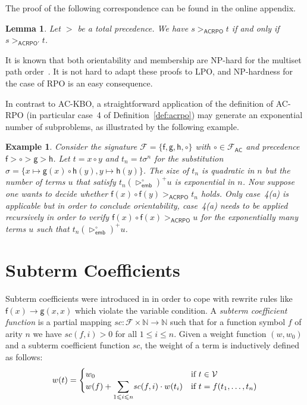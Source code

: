 \documentclass{tlp}
\newtheorem{lemma}[theorem]{Lemma}
\newtheorem{example}[theorem]{Example}
\newcommand{\embsm}[1]{\vartriangleright^{\!#1}_{\!\mathsf{emb}}}
\newcommand{\m}[1]{\mathsf{#1}}
\newcommand{\mc}[1]{\mathcal{#1}}
\newcommand{\mr}[1]{\mathrm{#1}}
\newcommand{\FF}{\mc{F}}
\newcommand{\VV}{\mc{V}}
\newcommand{\AC}{\mr{\m{AC}}}
\newcommand{\scoeff}{\mathit{sc}}
\newcommand{\acrpo}{\mr{\m{ACRPO}}}
\newcommand{\acrpoo}{\mr{\m{ACRPO'}}}
\newcommand{\seq}[2][n]{{#2_1},\dots,{#2_{#1}}}
\newcommand{\Nat}{\mathbb{N}}
\begin{document}
The proof of the following correspondence can be found in the online appendix.
\begin{lemma}
\label{lem:acrpo}
Let $>$ be a total precedence.
We have $s >_\acrpo t$ if and only if $s >_\acrpoo t$. 
\end{lemma}

It is known that both orientability and membership are NP-hard for the
multiset path order~\cite{KN85}. It is not hard to adapt these proofs to
LPO, and NP-hardness for the case of RPO is an easy consequence.

In contrast to AC-KBO, a straightforward application of the definition 
of AC-RPO (in particular case~4 of Definition~\ref{def:acrpo}) may 
generate an exponential number of subproblems, as illustrated by the 
following example.

\begin{example}
Consider the signature
$\FF = \{ \m{f}, \m{g}, \m{h}, \circ \}$ with $\circ \in \FF_\AC$ and
precedence $\m{f} > {\circ} > \m{g} > \m{h}$.
Let $t = x \circ y$ and $t_n = t\sigma^n$ for the substitution
$\sigma = \{ x \mapsto \m{g}(x) \circ \m{h}(y), y \mapsto \m{h}(y) \}$.
The size of $t_n$ is quadratic in $n$ but the number of terms $u$
that satisfy $t_n \mathrel{(\embsm{\circ})^+} u$ is exponential 
in $n$. Now suppose one wants to decide whether 
$\m{f}(x) \circ \m{f}(y) >_\acrpo t_n$ holds.
Only case~4(a) is applicable but in order to conclude orientability,
case~4(a) needs to be applied recursively in order to verify 
$\m{f}(x) \circ \m{f}(x) >_\acrpo  u$ for the exponentially many 
terms $u$ such that $t_n \mathrel{(\embsm{\circ})^+} u$.
\end{example}

\section{Subterm Coefficients}
\label{subterm coefficients}

Subterm coefficients were introduced in \cite{LW07} in order to
cope with rewrite rules like $\m{f}(x) \to \m{g}(x,x)$ which violate
the variable condition.
A \emph{subterm coefficient function} is a partial mapping
$\scoeff \colon \FF \times \Nat \to \Nat$ 
such that for a function symbol $f$ of arity $n$ we have
$\scoeff(f,i) > 0$ for all $1 \leqslant i \leqslant n$.
Given a weight function $(w,w_0)$ and a subterm coefficient 
function $\scoeff$, the weight of a term is inductively defined as follows:
\[
w(t) =
\begin{cases}
w_0 & \text{if $t \in \VV$} \\
\displaystyle w(f) + \smash[b]{\sum_{1 \leqslant i \leqslant n}}
\scoeff(f,i) \cdot w(t_i) & \text{if $t = f(\seq{t})$}
\end{cases}
\]
\end{document}

